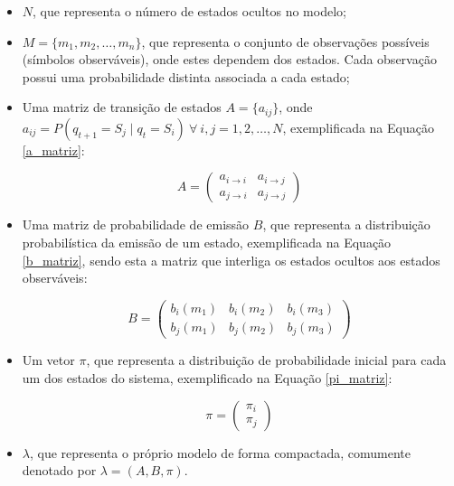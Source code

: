\documentclass[
    12pt,                %
    openright,           %
    oneside,             %
    a4paper,             %
    english,             %
    brazil               %
]{abntex2}
\begin{document}
\begin{itemize}
    \item $N$, que representa o número de estados ocultos no modelo;
    
    \item $M = \{m_1, m_2, \dots, m_n\}$, que representa o conjunto de observações possíveis (símbolos observáveis), 
    onde estes dependem dos estados. Cada observação possui uma probabilidade distinta associada a cada estado;

    \item Uma matriz de transição de 
    estados $A = \{a_{ij}\}$, onde $a_{ij} = P(q_{t+1} = S_j \mid q_t = S_i) \ \forall \ i,j = 1, 2, \dots, N$, 
    exemplificada na Equação \ref{a_matriz}:

    \begin{equation}
        A = \begin{pmatrix}
            a_{i \to i} & a_{i \to j} \\
            a_{j \to i} & a_{j \to j}
        \end{pmatrix}
        \label{a_matriz}
    \end{equation}

    \item Uma matriz de probabilidade de emissão $B$, que representa a distribuição probabilística da emissão de um estado, 
    exemplificada na Equação \ref{b_matriz}, sendo esta a matriz que interliga os estados ocultos aos estados observáveis:

    \begin{equation}
        B = \begin{pmatrix}
            b_i(m_1) & b_i(m_2) & b_i(m_3) \\
            b_j(m_1) & b_j(m_2) & b_j(m_3)
        \end{pmatrix}
        \label{b_matriz}
    \end{equation}

    \item Um vetor $\pi$, que representa a distribuição de probabilidade inicial para cada um dos estados do sistema, 
    exemplificado na Equação \ref{pi_matriz}:

    \begin{equation}
        \pi = \begin{pmatrix}
            \pi_i \\
            \pi_j
        \end{pmatrix}
        \label{pi_matriz}
    \end{equation}

    \item $\lambda$, que representa o próprio modelo de forma compactada, comumente denotado por $\lambda = (A, B, \pi)$.
\end{itemize}
\end{document}
